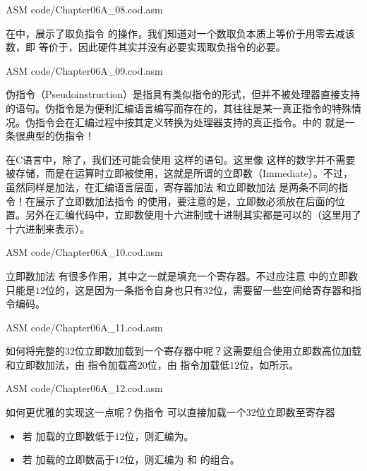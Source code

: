 \begin{Code}{ASM}
    code/Chapter06A_08.cod.asm
\end{Code}

在中，展示了取负指令 的操作，我们知道对一个数取负本质上等价于用零去减该数，即 等价于，因此硬件其实并没有必要实现取负指令的必要。

\begin{Code}{ASM}
    code/Chapter06A_09.cod.asm
\end{Code}

伪指令（Pseudoinstruction）是指具有类似指令的形式，但并不被处理器直接支持的语句。伪指令是为便利汇编语言编写而存在的，其往往是某一真正指令的特殊情况。伪指令会在汇编过程中按其定义转换为处理器支持的真正指令。中的 就是一条很典型的伪指令！

在C语言中，除了，我们还可能会使用 这样的语句。这里像 这样的数字并不需要被存储，而是在运算时立即被使用，这就是所谓的立即数（Immediate）。不过，虽然同样是加法，在汇编语言层面，寄存器加法 和立即数加法 是两条不同的指令！在展示了立即数加法指令 的使用，要注意的是，立即数必须放在后面的位置。另外在汇编代码中，立即数使用十六进制或十进制其实都是可以的（这里用了十六进制来表示）。
\begin{Code}{ASM}
    code/Chapter06A_10.cod.asm
\end{Code}

立即数加法 有很多作用，其中之一就是填充一个寄存器。不过应注意 中的立即数只能是$12$位的，这是因为一条指令自身也只有$32$位，需要留一些空间给寄存器和指令编码。
\begin{Code}{ASM}
    code/Chapter06A_11.cod.asm
\end{Code}

如何将完整的$32$位立即数加载到一个寄存器中呢？这需要组合使用立即数高位加载 和立即数加法，由 指令加载高$20$位，由 指令加载低$12$位，如所示。
\begin{Code}{ASM}
    code/Chapter06A_12.cod.asm
\end{Code}

如何更优雅的实现这一点呢？伪指令 可以直接加载一个$32$位立即数至寄存器
\begin{itemize}
    \item 若 加载的立即数低于$12$位，则汇编为。
    \item 若 加载的立即数高于$12$位，则汇编为 和 的组合。
\end{itemize}

